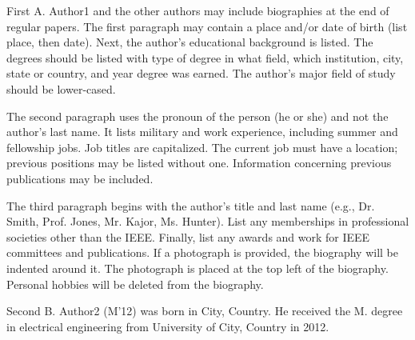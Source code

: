 \documentclass[journal]{IEEEtranTIE}
\begin{document}
{\color{red}
	
\vspace{-1cm}
\begin{IEEEbiography}
{First A. Author1} and the other authors may include biographies at the end of regular papers. The first paragraph may contain a place and/or date of birth (list place, then date). Next, the author's educational background is listed. The degrees should be listed with type of degree in what field, which institution, city, state or country, and year degree was earned. The author's major field of study should be lower-cased.

The second paragraph uses the pronoun of the person (he or she) and not the author's last name. It lists military and work experience, including summer and fellowship jobs. Job titles are capitalized. The current job must have a location; previous positions may be listed without one. Information concerning previous publications may be included.

The third paragraph begins with the author's title and last name (e.g., Dr. Smith, Prof. Jones, Mr. Kajor, Ms. Hunter). List any memberships in professional societies other than the IEEE. Finally, list any awards and work for IEEE committees and publications. If a photograph is provided, the biography will be indented around it. The photograph is placed at the top left of the biography. Personal hobbies will be deleted from the biography.
\end{IEEEbiography}

\vspace{-2cm}
\begin{IEEEbiography}
{Second B. Author2} (M'12) was born in City, Country. He received the M. degree in electrical engineering from University of City, Country in 2012.


\end{IEEEbiography}}
\end{document}
